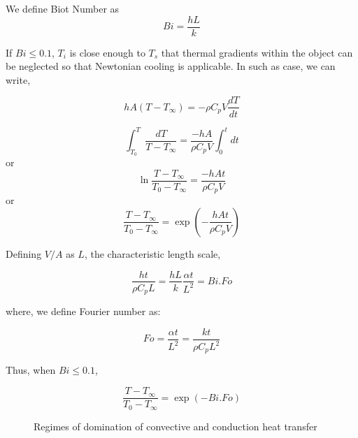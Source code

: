 We define Biot Number as
$$Bi = \frac{hL}{k}$$

If $Bi \le 0.1$, $T_i$ is close enough to $T_s$ that thermal gradients within
the object can be neglected so that Newtonian cooling is applicable. In such as
case, we can write,

$$ h A \left(T - T_\infty \right) = -\rho C_p V \frac{dT}{dt} $$

$$ \int_{T_0}^{T}{\frac{dT}{T-T_\infty}} = \frac{-hA}{\rho C_p V}
\int_{0}^{t}{dt}$$
or
$$ \ln{\frac{T-T_\infty}{T_0-T_\infty}} = \frac{-hAt}{\rho C_p V}$$
or
$$ \frac{T-T_\infty}{T_0-T_\infty} = \exp{\left(-\frac{hAt}{\rho C_p
V}\right)}$$

Defining $V/A$ as $L$, the characteristic length scale,

$$ \frac{ht}{\rho C_p L} = \frac{hL}{k} \frac{\alpha t}{L^2} = Bi.Fo$$

where, we define Fourier number as:

$$Fo = \frac{\alpha t}{L^2} = \frac{kt}{\rho C_p L^2}$$

Thus, when $Bi \le 0.1$,

$$ \frac{T - T_\infty}{T_0 - T_\infty} = \exp{\left(-Bi.Fo\right)}$$

\begin{figure}[h]
	\begin{center}
	\end{center}
	\caption{Regimes of domination of convective and conduction heat transfer}
	\label{bejanmap}
\end{figure}


